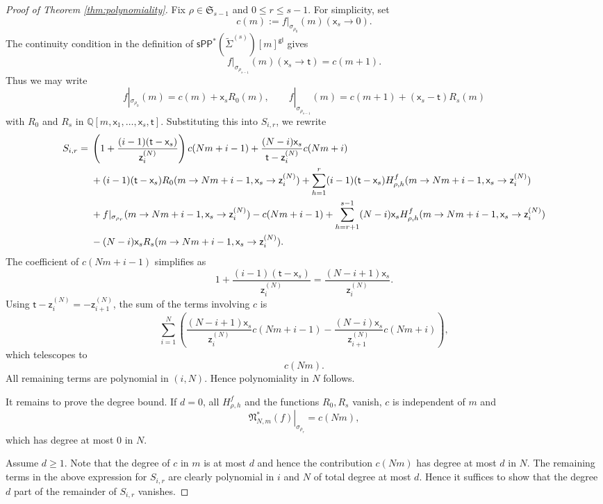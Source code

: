 \documentclass[11pt]{article}
\newcommand{\sPP}{\mathsf{sPP}}
\newcommand{\spp}{\sPP}
\theoremstyle{definition}
\begin{document}
\begin{proof}[Proof of Theorem \ref{thm:polynomiality}]
	Fix $\rho\in \mathfrak S_{s-1}$ and $0\le r\le s-1$. For simplicity, set
	\[
		c(m):=f|_{\sigma_{\rho_0}}(m)(\mathsf{x}_s\to 0).
	\]
	The continuity condition in the definition of $\spp^{\ast}(\tilde{\Sigma}^{(s)})[m]^{\mathsf{gl}}$ gives
	\[
		f|_{\sigma_{\rho_{s-1}}}(m)(\mathsf{x}_s\to \mathsf{t})=c(m+1).
	\]
	Thus we may write
	\[
		f|_{\sigma_{\rho_0}}(m)=c(m)+\mathsf{x}_sR_0(m),\qquad
		f|_{\sigma_{\rho_{s-1}}}(m)=c(m+1)+(\mathsf{x}_s-\mathsf{t})R_s(m)
	\]
	with $R_0$ and $R_s$ in $\mathbb{Q}[m,\mathsf{x}_1,\dots,\mathsf{x}_s,\mathsf{t}]$. Substituting this into $S_{i,r}$, we rewrite
    {\allowdisplaybreaks
	\begin{align*}
		S_{i,r}={}&\left(1+\frac{(i-1)(\mathsf{t}-\mathsf{x}_s)}{\mathsf{z}_i^{(N)}}\right)c(Nm+i-1)
		+\frac{(N-i)\mathsf{x}_s}{\mathsf{t}-\mathsf{z}_i^{(N)}}c(Nm+i)\\
				  &+(i-1)(\mathsf{t}-\mathsf{x}_s)R_0(m\to Nm+i-1,\mathsf{x}_s\to \mathsf{z}_i^{(N)})
				  +\sum_{h=1}^{r}(i-1)(\mathsf{t}-\mathsf{x}_s)H_{\rho,h}^f(m\to Nm+i-1,\mathsf{x}_s\to \mathsf{z}_i^{(N)})\notag\\
				  &+f|_{\sigma_{\rho_r}}(m\to Nm+i-1,\mathsf{x}_s\to \mathsf{z}_i^{(N)})-c(Nm+i-1)
				  +\sum_{h=r+1}^{s-1}(N-i)\mathsf{x}_sH_{\rho,h}^f(m\to Nm+i-1,\mathsf{x}_s\to \mathsf{z}_i^{(N)})\notag\\
				  &-(N-i)\mathsf{x}_sR_s(m\to Nm+i-1,\mathsf{x}_s\to \mathsf{z}_i^{(N)}).
	\end{align*}}
	The coefficient of $c(Nm+i-1)$ simplifies as
	\[
		1+\frac{(i-1)(\mathsf{t}-\mathsf{x}_s)}{\mathsf{z}_i^{(N)}}=\frac{(N-i+1)\mathsf{x}_s}{\mathsf{z}_i^{(N)}}.
	\]
	Using $\mathsf{t}-\mathsf{z}_i^{(N)}=-\mathsf{z}_{i+1}^{(N)}$, the sum of the terms involving
	$c$ is
	\[
		\sum_{i=1}^N\left(\frac{(N-i+1)\mathsf{x}_s}{\mathsf{z}_i^{(N)}}c(Nm+i-1)
		-\frac{(N-i)\mathsf{x}_s}{\mathsf{z}_{i+1}^{(N)}}c(Nm+i)\right),
	\]
	which telescopes to
	\[
		c(Nm).
	\]
	All remaining terms are polynomial in $(i,N)$. Hence polynomiality in $N$ follows.

	It remains to prove the degree bound. If $d=0$, all $H_{\rho,h}^{f}$ and the functions $R_0,R_s$ vanish, $c$ is independent
	of $m$ and
	\[
		\left.\mathfrak N_{N,m}^\ast(f)\right|_{\sigma_{\rho_r}}=c(Nm),
	\]
	which has degree at most $0$ in $N$.

	Assume $d\ge 1$. Note that the degree of $c$ in $m$ is at most $d$ and hence the contribution $c(Nm)$ has
	degree at most $d$ in $N$. The remaining terms in the above expression for $S_{i,r}$ are clearly polynomial in $i$ and $N$ of total
	degree at most $d$. Hence it suffices to show that the degree $d$ part of the remainder of $S_{i,r}$ vanishes.


\end{proof}
\end{document}
